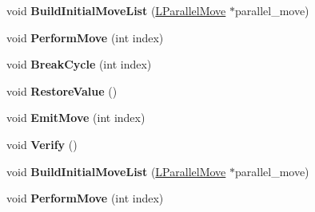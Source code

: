 \begin{DoxyCompactItemize}
\item 
void {\bfseries Build\+Initial\+Move\+List} (\hyperlink{classv8_1_1internal_1_1_l_parallel_move}{L\+Parallel\+Move} $\ast$parallel\+\_\+move)\hypertarget{classv8_1_1internal_1_1_b_a_s_e___e_m_b_e_d_d_e_d_a18e46b4919bd34c5ff192a955f86238d}{}\label{classv8_1_1internal_1_1_b_a_s_e___e_m_b_e_d_d_e_d_a18e46b4919bd34c5ff192a955f86238d}

\item 
void {\bfseries Perform\+Move} (int index)\hypertarget{classv8_1_1internal_1_1_b_a_s_e___e_m_b_e_d_d_e_d_a01fea4beaf81ccc3a326c14fdda8a2aa}{}\label{classv8_1_1internal_1_1_b_a_s_e___e_m_b_e_d_d_e_d_a01fea4beaf81ccc3a326c14fdda8a2aa}

\item 
void {\bfseries Break\+Cycle} (int index)\hypertarget{classv8_1_1internal_1_1_b_a_s_e___e_m_b_e_d_d_e_d_a5de6146d54eea60dd1d47b73b51a4905}{}\label{classv8_1_1internal_1_1_b_a_s_e___e_m_b_e_d_d_e_d_a5de6146d54eea60dd1d47b73b51a4905}

\item 
void {\bfseries Restore\+Value} ()\hypertarget{classv8_1_1internal_1_1_b_a_s_e___e_m_b_e_d_d_e_d_a5dca5ddf8849980c4195449ae562e8b9}{}\label{classv8_1_1internal_1_1_b_a_s_e___e_m_b_e_d_d_e_d_a5dca5ddf8849980c4195449ae562e8b9}

\item 
void {\bfseries Emit\+Move} (int index)\hypertarget{classv8_1_1internal_1_1_b_a_s_e___e_m_b_e_d_d_e_d_a50988d2a86b49713575ec93e3c922dcf}{}\label{classv8_1_1internal_1_1_b_a_s_e___e_m_b_e_d_d_e_d_a50988d2a86b49713575ec93e3c922dcf}

\item 
void {\bfseries Verify} ()\hypertarget{classv8_1_1internal_1_1_b_a_s_e___e_m_b_e_d_d_e_d_a46f1b6e1093c631ee3b7dfca3abc94e9}{}\label{classv8_1_1internal_1_1_b_a_s_e___e_m_b_e_d_d_e_d_a46f1b6e1093c631ee3b7dfca3abc94e9}

\item 
void {\bfseries Build\+Initial\+Move\+List} (\hyperlink{classv8_1_1internal_1_1_l_parallel_move}{L\+Parallel\+Move} $\ast$parallel\+\_\+move)\hypertarget{classv8_1_1internal_1_1_b_a_s_e___e_m_b_e_d_d_e_d_a18e46b4919bd34c5ff192a955f86238d}{}\label{classv8_1_1internal_1_1_b_a_s_e___e_m_b_e_d_d_e_d_a18e46b4919bd34c5ff192a955f86238d}

\item 
void {\bfseries Perform\+Move} (int index)\hypertarget{classv8_1_1internal_1_1_b_a_s_e___e_m_b_e_d_d_e_d_a01fea4beaf81ccc3a326c14fdda8a2aa}{}\label{classv8_1_1internal_1_1_b_a_s_e___e_m_b_e_d_d_e_d_a01fea4beaf81ccc3a326c14fdda8a2aa}


\end{DoxyCompactItemize}
